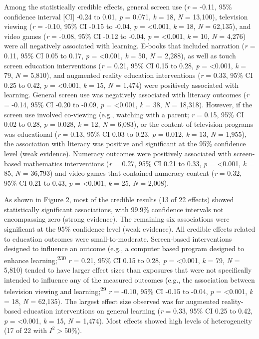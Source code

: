 \documentclass[
  english,
  man]{apa6}
\begin{document}
Among the statistically credible effects, general screen use (\emph{r} = -0.11, 95\% confidence interval {[}CI{]} -0.24 to 0.01, \emph{p} = 0.071, \emph{k} = 18, \emph{N} = 13,100), television viewing (\emph{r} = -0.10, 95\% CI -0.15 to -0.04, \emph{p} = \textless0.001, \emph{k} = 18, \emph{N} = 62,135), and video games (\emph{r} = -0.08, 95\% CI -0.12 to -0.04, \emph{p} = \textless0.001, \emph{k} = 10, \emph{N} = 4,276) were all negatively associated with learning.
E-books that included narration (\emph{r} = 0.11, 95\% CI 0.05 to 0.17, \emph{p} = \textless0.001, \emph{k} = 50, \emph{N} = 2,288), as well as touch screen education interventions (\emph{r} = 0.21, 95\% CI 0.15 to 0.28, \emph{p} = \textless0.001, \emph{k} = 79, \emph{N} = 5,810), and augmented reality education interventions (\emph{r} = 0.33, 95\% CI 0.25 to 0.42, \emph{p} = \textless0.001, \emph{k} = 15, \emph{N} = 1,474) were positively associated with learning.
General screen use was negatively associated with literacy outcomes (\emph{r} = -0.14, 95\% CI -0.20 to -0.09, \emph{p} = \textless0.001, \emph{k} = 38, \emph{N} = 18,318).
However, if the screen use involved co-viewing (e.g., watching with a parent; \emph{r} = 0.15, 95\% CI 0.02 to 0.28, \emph{p} = 0.028, \emph{k} = 12, \emph{N} = 6,083), or the content of television programs was educational (\emph{r} = 0.13, 95\% CI 0.03 to 0.23, \emph{p} = 0.012, \emph{k} = 13, \emph{N} = 1,955), the association with literacy was positive and significant at the 95\% confidence level (weak evidence).
Numeracy outcomes were positively associated with screen-based mathematics interventions (\emph{r} = 0.27, 95\% CI 0.21 to 0.33, \emph{p} = \textless0.001, \emph{k} = 85, \emph{N} = 36,793) and video games that contained numeracy content (\emph{r} = 0.32, 95\% CI 0.21 to 0.43, \emph{p} = \textless0.001, \emph{k} = 25, \emph{N} = 2,008).

As shown in Figure 2, most of the credible results (13 of 22 effects) showed statistically significant associations, with 99.9\% confidence intervals not encompassing zero (strong evidence).
The remaining six associations were significant at the 95\% confidence level (weak evidence).
All credible effects related to education outcomes were small-to-moderate.
Screen-based interventions designed to influence an outcome (e.g., a computer based program designed to enhance learning;\textsuperscript{230} \emph{r} = 0.21, 95\% CI 0.15 to 0.28, \emph{p} = \textless0.001, \emph{k} = 79, \emph{N} = 5,810) tended to have larger effect sizes than exposures that were not specifically intended to influence any of the measured outcomes (e.g., the association between television viewing and learning;\textsuperscript{29} \emph{r} = -0.10, 95\% CI -0.15 to -0.04, \emph{p} = \textless0.001, \emph{k} = 18, \emph{N} = 62,135).
The largest effect size observed was for augmented reality-based education interventions on general learning (\emph{r} = 0.33, 95\% CI 0.25 to 0.42, \emph{p} = \textless0.001, \emph{k} = 15, \emph{N} = 1,474).
Most effects showed high levels of heterogeneity (17 of 22 with \(I^2 > 50\%\)).
\end{document}
